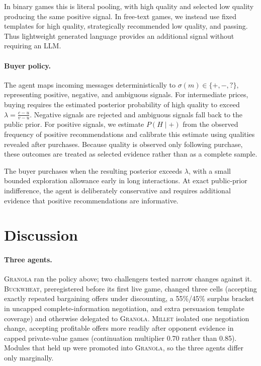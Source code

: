 \documentclass{article}
\newcommand{\competitionname}{\textsc{Granola}}
\newcommand{\challengername}{\textsc{Buckwheat}}
\newcommand{\milletname}{\textsc{Millet}}
\begin{document}
In binary games this is literal pooling, with high quality and selected low quality producing the same positive signal.
In free-text games, we instead use fixed templates for high quality, strategically recommended low quality, and passing.
Thus lightweight generated language provides an additional signal without requiring an LLM.

\paragraph{Buyer policy.}
The agent maps incoming messages deterministically to
\(
    \sigma(m)\in\{+,-,?\},
\)
representing positive, negative, and ambiguous signals.
For intermediate prices, buying requires the estimated posterior probability of high quality to exceed
\(
    \lambda=\frac{c-u}{v-u}.
\)
Negative signals are rejected and ambiguous signals fall back to the public prior.
For positive signals, we estimate $P(H\mid+)$ from the observed frequency of positive recommendations and calibrate this estimate using qualities revealed after purchases.
Because quality is observed only following purchase, these outcomes are treated as selected evidence rather than as a complete sample.

The buyer purchases when the resulting posterior exceeds $\lambda$, with a small bounded exploration allowance early in long interactions.
At exact public-prior indifference, the agent is deliberately conservative and requires additional evidence that positive recommendations are informative.

\section{Discussion}
\label{sec:discussion}

\paragraph{Three agents.}
\competitionname{} ran the policy above; two challengers tested narrow changes against it.
\challengername{}, preregistered before its first live game, changed three cells (accepting exactly repeated bargaining offers under discounting, a 55\%/45\% surplus bracket in uncapped complete-information negotiation, and extra persuasion template coverage) and otherwise delegated to \competitionname{}.
\milletname{} isolated one negotiation change, accepting profitable offers more readily after opponent evidence in capped private-value games (continuation multiplier 0.70 rather than 0.85).
Modules that held up were promoted into \competitionname{}, so the three agents differ only marginally.
\end{document}

